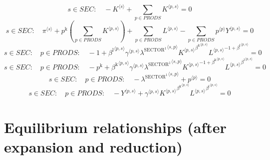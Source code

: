 \begin{equation}
s\in {S\!E\!C}\colon\quad -{K}^{\langle s\rangle} + \sum_{p\in {P\!R\!O\!D\!S}} {K}^{\langle p,s\rangle} = 0
\end{equation}
\begin{equation}
s\in {S\!E\!C}\colon\quad {\pi}^{\langle s\rangle} + {p^{\mathrm{k}}} \left(\sum_{p\in {P\!R\!O\!D\!S}} {K}^{\langle p,s\rangle}\right) + \sum_{p\in {P\!R\!O\!D\!S}} {L}^{\langle p,s\rangle} - \sum_{p\in {P\!R\!O\!D\!S}} {{p}^{\langle p\rangle}} {{Y}^{\langle p,s\rangle}} = 0
\end{equation}
\begin{equation}
s\in {S\!E\!C}\colon\quad p\in {P\!R\!O\!D\!S}\colon\quad -1 + {{\beta^{\mathrm{l}}}^{\langle p,s\rangle}} {{\gamma}^{\langle p,s\rangle}} {{\lambda^{\mathrm{SECTOR}^{\mathrm{1}}}}^{\langle s,p\rangle}} {{{K}^{\langle p,s\rangle}}^{{\beta^{\mathrm{k}}}^{\langle p,s\rangle}}} {{{L}^{\langle p,s\rangle}}^{-1 + {\beta^{\mathrm{l}}}^{\langle p,s\rangle}}} = 0
\end{equation}
\begin{equation}
s\in {S\!E\!C}\colon\quad p\in {P\!R\!O\!D\!S}\colon\quad -p^{\mathrm{k}} + {{\beta^{\mathrm{k}}}^{\langle p,s\rangle}} {{\gamma}^{\langle p,s\rangle}} {{\lambda^{\mathrm{SECTOR}^{\mathrm{1}}}}^{\langle s,p\rangle}} {{{K}^{\langle p,s\rangle}}^{-1 + {\beta^{\mathrm{k}}}^{\langle p,s\rangle}}} {{{L}^{\langle p,s\rangle}}^{{\beta^{\mathrm{l}}}^{\langle p,s\rangle}}} = 0
\end{equation}
\begin{equation}
s\in {S\!E\!C}\colon\quad p\in {P\!R\!O\!D\!S}\colon\quad -{\lambda^{\mathrm{SECTOR}^{\mathrm{1}}}}^{\langle s,p\rangle} + {p}^{\langle p\rangle} = 0
\end{equation}
\begin{equation}
s\in {S\!E\!C}\colon\quad p\in {P\!R\!O\!D\!S}\colon\quad -{Y}^{\langle p,s\rangle} + {{\gamma}^{\langle p,s\rangle}} {{{K}^{\langle p,s\rangle}}^{{\beta^{\mathrm{k}}}^{\langle p,s\rangle}}} {{{L}^{\langle p,s\rangle}}^{{\beta^{\mathrm{l}}}^{\langle p,s\rangle}}} = 0
\end{equation}



\section{Equilibrium relationships (after expansion and reduction)}

